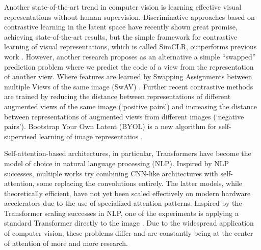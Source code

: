 \documentclass[
]{krantz}
\begin{document}
Another state-of-the-art trend in computer vision is learning effective visual representations without human supervision. Discriminative approaches based on contrastive learning in the latent space have recently shown great promise, achieving state-of-the-art results, but the simple framework for contrastive learning of visual representations, which is called SimCLR, outperforms previous work \citep{SimCLR}. However, another research proposes as an alternative a simple ``swapped'' prediction problem where we predict the code of a view from the representation of another view. Where features are learned by Swapping Assignments between multiple Views of the same image (SwAV) \citep{SwAV}.
Further recent contrastive methods are trained by reducing the distance between representations of different augmented views of the same image (`positive pairs') and increasing the distance between representations of augmented views from different images (`negative pairs'). Bootstrap Your Own Latent (BYOL) is a new algorithm for self-supervised learning of image representatios \citep{BYOL}.

Self-attention-based architectures, in particular, Transformers have become the model of choice in natural language processing (NLP). Inspired by NLP successes, multiple works try combining CNN-like architectures with self-attention, some replacing the convolutions entirely. The latter models, while theoretically efficient, have not yet been scaled effectively on modern hardware accelerators due to the use of specialized attention patterns. Inspired by the Transformer scaling successes in NLP, one of the experiments is applying a standard Transformer directly to the image \citep{ImageT}. Due to the widespread application of computer vision, these problems differ and are constantly being at the center of attention of more and more research.
\end{document}
